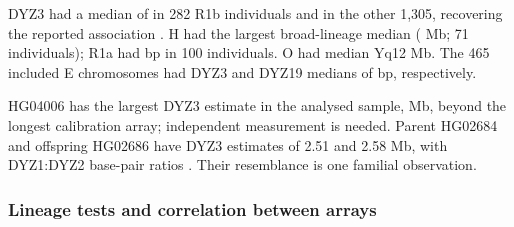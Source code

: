 DYZ3 had a median of  in 282 R1b individuals and  in the other 1,305, recovering the reported association \cite{Hallast2023}. H had the largest broad-lineage median ( Mb; 71 individuals); R1a had  bp in 100 individuals. O had median Yq12  Mb. The 465 included E chromosomes had DYZ3 and DYZ19 medians of  bp, respectively.

HG04006 has the largest DYZ3 estimate in the analysed sample,  Mb, beyond the longest calibration array; independent measurement is needed. Parent HG02684 and offspring HG02686 have DYZ3 estimates of 2.51 and 2.58 Mb, with DYZ1:DYZ2 base-pair ratios . Their resemblance is one familial observation.

\subsubsection{Lineage tests and correlation between arrays}\label{sec:res-tests}
